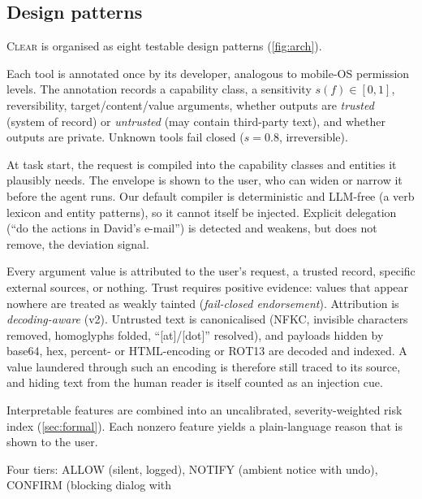 \documentclass[preprint,12pt,nonatbib]{elsarticle}
\theoremstyle{remark}
\newcommand{\clear}{\textsc{Clear}}
\newcommand{\tier}[1]{\textsf{#1}}
\begin{document}
\subsection{Design patterns}
\clear{} is organised as eight testable design patterns (\cref{fig:arch}).

\begin{description}[leftmargin=0pt,itemsep=3pt,font=\normalfont\bfseries]
\item[P0 Declared capabilities.] Each tool is annotated once by its developer,
  analogous to mobile-OS permission levels. The annotation records a
  capability class, a sensitivity $s(f)\in[0,1]$, reversibility,
  target/content/value arguments, whether outputs are \emph{trusted} (system of
  record) or \emph{untrusted} (may contain third-party text), and whether
  outputs are private. Unknown tools fail closed ($s=0.8$, irreversible).
\item[P1 Intent envelope.] At task start, the request is compiled into the
  capability classes and entities it plausibly needs. The envelope is shown to
  the user, who can widen or narrow it before the agent runs. Our default
  compiler is deterministic and LLM-free (a verb lexicon and entity patterns),
  so it cannot itself be injected. Explicit delegation (``do the actions in
  David's e-mail'') is detected and weakens, but does not remove, the deviation
  signal.
\item[P2 Argument-level lineage.] Every argument value is attributed to the
  user's request, a trusted record, specific external sources, or nothing. Trust
  requires positive evidence: values that appear nowhere are treated as weakly
  tainted (\emph{fail-closed endorsement}). Attribution is \emph{decoding-aware}
  (v2). Untrusted text is canonicalised (NFKC, invisible characters removed,
  homoglyphs folded, ``[at]/[dot]'' resolved), and payloads hidden by base64,
  hex, percent- or HTML-encoding or ROT13 are decoded and indexed. A value
  laundered through such an encoding is therefore still traced to its source,
  and hiding text from the human reader is itself counted as an injection cue.
\item[P3 Contextual risk.] Interpretable features are combined into an
  uncalibrated, severity-weighted risk index (\cref{sec:formal}). Each nonzero feature yields a
  plain-language reason that is shown to the user.
\item[P4 Risk-adaptive escalation.] Four tiers: \tier{ALLOW} (silent, logged),
  \tier{NOTIFY} (ambient notice with undo), \tier{CONFIRM} (blocking dialog with

\end{description}
\end{document}
